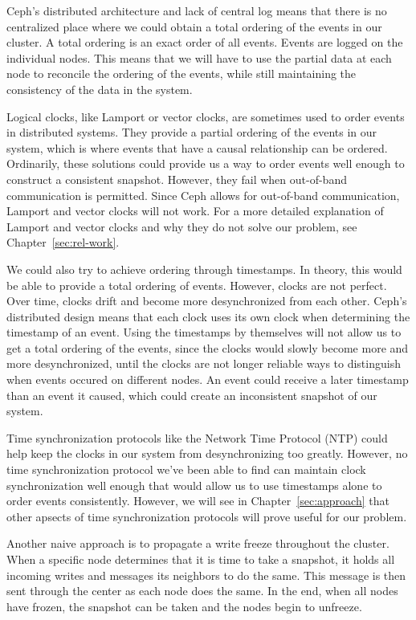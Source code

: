 Ceph's distributed architecture and lack of central log means that there is no
centralized place where we could obtain a total ordering of the events in our
cluster. A total ordering is an exact order of all events. Events
are logged on the individual nodes. This means that we will have to
use the partial data at each node to reconcile the ordering of the events, 
while still maintaining the consistency of the data in the system.

Logical clocks, like Lamport or vector clocks, are sometimes used to order 
events in distributed systems. They provide a partial ordering of the events in our system, which is
where events that have a causal relationship can be ordered. Ordinarily, these solutions could provide us a way to order events well enough to construct a consistent snapshot. However, they fail when
out-of-band communication is permitted. Since Ceph allows for out-of-band 
communication, Lamport and vector clocks will not work. For a more detailed explanation
of Lamport and vector clocks and why they do not solve our problem, see 
Chapter~\ref{sec:rel-work}.

We could also try to achieve ordering through timestamps. In theory,
this would be able to provide a total ordering of events. However, clocks are not perfect. Over time, clocks drift and become more desynchronized from each other. Ceph's distributed design means that each clock uses its own clock
when determining the timestamp of an event. Using the timestamps by themselves
will not allow us to get a total ordering of the events, since the clocks
would slowly become more and more desynchronized, until the clocks are not 
longer reliable ways to distinguish when events occured on different nodes. An 
event could receive a later timestamp than an event it caused, which could 
create an inconsistent snapshot of our system. 

Time synchronization protocols like the Network Time Protocol (NTP) could help
keep the clocks in our system from desynchronizing too greatly. However, no
time synchronization protocol we've been able to find can maintain 
clock synchronization well enough that would allow us to use timestamps alone
to order events consistently. However, we will see in Chapter~\ref{sec:approach} that other apsects of time synchronization protocols will prove useful
for our problem.

Another naive approach is to propagate a write freeze throughout the cluster. 
When a specific node determines that it is time to take a snapshot, it holds 
all incoming writes and messages its neighbors to do the same. This message 
is then sent through the center as each node does the same. In the end, when 
all nodes have frozen, the snapshot can be taken and the nodes begin to 
unfreeze. 

